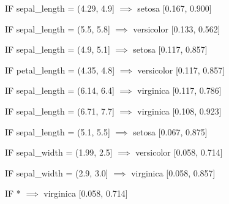 IF sepal\_length = (4.29, 4.9] $\implies$ setosa [0.167, 0.900]

IF sepal\_length = (5.5, 5.8] $\implies$ versicolor [0.133, 0.562]

IF sepal\_length = (4.9, 5.1] $\implies$ setosa [0.117, 0.857]

IF petal\_length = (4.35, 4.8] $\implies$ versicolor [0.117, 0.857]

IF sepal\_length = (6.14, 6.4] $\implies$ virginica [0.117, 0.786]

IF sepal\_length = (6.71, 7.7] $\implies$ virginica [0.108, 0.923]

IF sepal\_length = (5.1, 5.5] $\implies$ setosa [0.067, 0.875]

IF sepal\_width = (1.99, 2.5] $\implies$ versicolor [0.058, 0.714]

IF sepal\_width = (2.9, 3.0] $\implies$ virginica [0.058, 0.857]

IF * $\implies$ virginica [0.058, 0.714]
